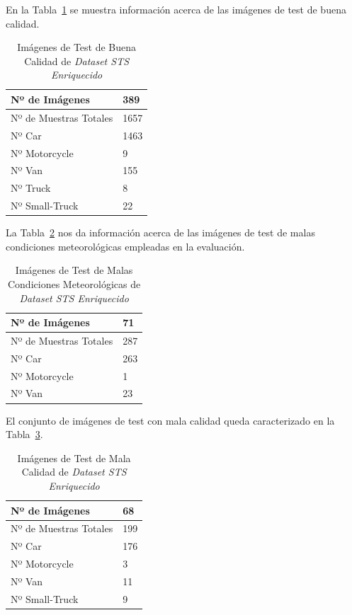 En la Tabla~\ref{tab_img_test_buenas} se muestra información acerca de las imágenes de test de buena calidad.
\begin{table}[H] 
\begin{center}
\begin{tabular}{|l|l|}
\hline
Nº de Imágenes  & 389 \\
\hline \hline
Nº de Muestras Totales & 1657\\ \hline
Nº Car & 1463 \\ \hline
Nº Motorcycle & 9 \\ \hline
Nº Van & 155 \\ \hline
Nº Truck & 8 \\ \hline
Nº Small-Truck & 22 \\ \hline
\end{tabular}
\caption{Imágenes de Test de Buena Calidad de \textit{Dataset STS Enriquecido}}
\label{tab_img_test_buenas}
\end{center}
\end{table}

La Tabla~\ref{tab_img_test_malas_condiciones} nos da información acerca de las imágenes de test de malas condiciones meteorológicas empleadas en la evaluación.
\begin{table}[H] 
\begin{center}
\begin{tabular}{|l|l|}
\hline
Nº de Imágenes  & 71 \\
\hline \hline
Nº de Muestras Totales & 287\\ \hline
Nº Car & 263 \\ \hline
Nº Motorcycle & 1 \\ \hline
Nº Van & 23 \\ \hline
\end{tabular}
\caption{Imágenes de Test de Malas Condiciones Meteorológicas de \textit{Dataset STS Enriquecido}}
\label{tab_img_test_malas_condiciones}
\end{center}
\end{table}

El conjunto de imágenes de test con mala calidad queda caracterizado en la Tabla~\ref{tab_img_test_mala_calidad}.

\begin{table}[H] 
\begin{center}
\begin{tabular}{|l|l|}
\hline
Nº de Imágenes  & 68 \\
\hline \hline
Nº de Muestras Totales & 199\\ \hline
Nº Car & 176 \\ \hline
Nº Motorcycle & 3 \\ \hline
Nº Van & 11 \\ \hline
Nº Small-Truck & 9 \\ \hline
\end{tabular}
\caption{Imágenes de Test de Mala Calidad de \textit{Dataset STS Enriquecido}}
\label{tab_img_test_mala_calidad}
\end{center}
\end{table}


